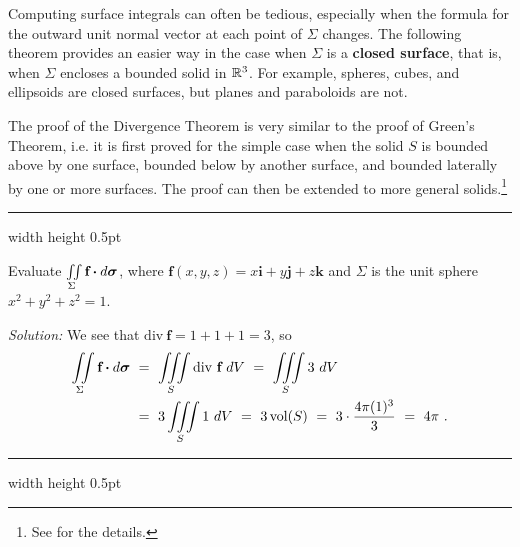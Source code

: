 Computing surface integrals can often be tedious, especially when the formula for the
outward unit normal vector at each point of $\Sigma$ changes. The following theorem provides an easier way
in the case
when $\Sigma$ is a \textbf{closed surface}, that is, when $\Sigma$ encloses a bounded solid in $\mathbb{R}^{3}$. For example,
spheres, cubes, and ellipsoids are closed surfaces, but planes and paraboloids are not.
\newpage
{}

The proof of the Divergence Theorem is very similar to the proof of Green's Theorem, i.e. it is first proved for
the simple case when the solid $S$ is bounded above by one surface, bounded below by another surface, and bounded
laterally by one or more surfaces. The proof can then be extended to more general solids.\footnote{See
\cite[\S\,15.6]{tm} for the details.}

\vspace{3mm}
\hrule width \textwidth height 0.5pt
\begin{exmp}
 Evaluate $\iint\limits_{\Sigma} \textbf{f} \bm{\cdot} d\bm{\sigma}$, where $\textbf{f}(x,y,z) = x\textbf{i} +
  y\textbf{j} + z\textbf{k}$ and $\Sigma$ is the unit sphere $x^2 + y^2 + z^2 = 1$.\vspace{1mm}
 \par\noindent \emph{Solution:} We see that $\text{div}~\textbf{f} = 1+1+1=3$, so
 \begin{align*}
  \iint\limits_{\Sigma} \textbf{f} \bm{\cdot} d\bm{\sigma} ~&=~
  \iiint\limits_{S} \text{div}~\textbf{f} ~dV
  ~=~ \iiint\limits_{S} 3 ~dV\\
  &=~ 3 \iiint\limits_{S} 1 ~dV
  ~=~ 3\,\text{vol}(S) ~=~ 3\cdot \frac{4\pi (1)^3}{3} ~=~ 4\pi ~.
 \end{align*}
\end{exmp}
\hrule width \textwidth height 0.5pt
\vspace{3mm}

